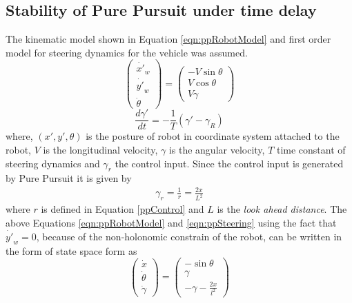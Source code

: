 \chapter[]{}
\label{appendix_b}
\section*{Stability of Pure Pursuit under time delay}
\label{app:ollero}
The kinematic model shown in Equation \ref{eqn:ppRobotModel}  and first order model for steering dynamics for the vehicle was assumed. 
\begin{equation}
\label{eqn:ppRobotModel}
\begin{pmatrix}
\dot{x'}_w\\ \dot{y'}_w\\ \dot{\theta}
\end{pmatrix}
=
\begin{pmatrix}
-V \sin\theta\\ V\cos\theta\\V\gamma
\end{pmatrix}
\end{equation}
\begin{equation}
\label{eqn:ppSteering}
\frac{d\gamma'}{dt}=-\frac{1}{T}(\gamma'-\gamma_R)
\end{equation}
where, $(x',y',\theta)$ is the posture of robot in coordinate system attached to the robot,  $V$  is the longitudinal velocity,  $\gamma$ is the angular velocity, $T$ time constant of steering dynamics and $\gamma_r$ the control input.  Since the control input is generated by Pure Pursuit it is given by
\begin{eqnarray}
\gamma_r=\frac{1}{r}=\frac{2x}{L^2}
\end{eqnarray} 
where $r$ is defined in Equation \ref{ppControl} and $L$ is the \textit{look ahead distance}. The above Equations \ref{eqn:ppRobotModel} and \ref{eqn:ppSteering}  using the fact that $\dot{y'}_w=0$, because of the non-holonomic constrain of the robot, can be written  in the form of state space  form  as 
\begin{equation}
\begin{pmatrix}
\dot{x}\\\dot{\theta}\\\dot{\gamma}
\end{pmatrix}
=
\begin{pmatrix}
-\sin\theta\\ \gamma \\ -\gamma -\frac{2x}{l^2}
\end{pmatrix}
\end{equation}
